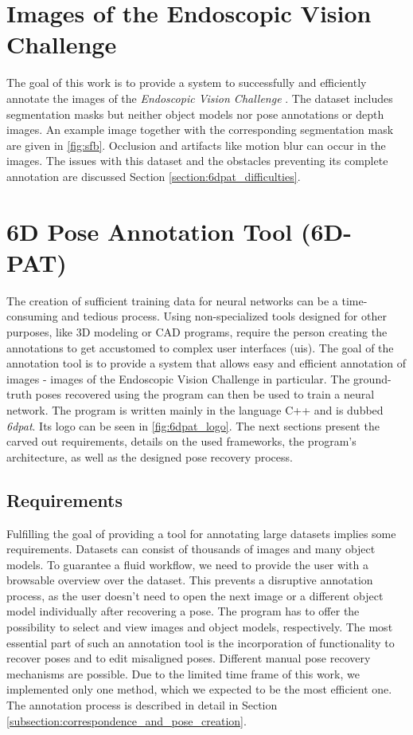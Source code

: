 \section{Images of the Endoscopic Vision Challenge}

The goal of this work is to provide a system to successfully and efficiently annotate the images of the \textit{Endoscopic Vision Challenge} \cite{endovis}. The dataset includes segmentation masks but neither object models nor pose annotations or depth images. An example image together with the corresponding segmentation mask are given in \fig \ref{fig:sfb}. Occlusion and artifacts like motion blur can occur in the images. The issues with this dataset and the obstacles preventing its complete annotation are discussed Section \ref{section:6dpat_difficulties}. 

\section{6D Pose Annotation Tool (6D-PAT)}

The creation of sufficient training data for neural networks can be a time-consuming and tedious process. Using non-specialized tools designed for other purposes, like 3D modeling or CAD programs, require the person creating the annotations to get accustomed to complex user interfaces (\acp{ui}). The goal of the annotation tool is to provide a system that allows easy and efficient annotation of images - images of the Endoscopic Vision Challenge in particular. The ground-truth poses recovered using the program can then be used to train a neural network. The program is written mainly in the language C++ and is dubbed \textit{\acf{6dpat}}. Its logo can be seen in \fig \ref{fig:6dpat_logo}. The next sections present the carved out requirements, details on the used frameworks, the program's architecture, as well as the designed pose recovery process.

\subsection{Requirements}

Fulfilling the goal of providing a tool for annotating large datasets implies some requirements. Datasets can consist of thousands of images and many object models. To guarantee a fluid workflow, we need to provide the user with a browsable overview over the dataset. This prevents a disruptive annotation process, as the user doesn't need to open the next image or a different object model individually after recovering a pose. The program has to offer the possibility to select and view images and object models, respectively. The most essential part of such an annotation tool is the incorporation of functionality to recover poses and to edit misaligned poses. Different manual pose recovery mechanisms are possible. Due to the limited time frame of this work, we implemented only one method, which we expected to be the most efficient one. The annotation process is described in detail in Section \ref{subsection:correspondence_and_pose_creation}.

